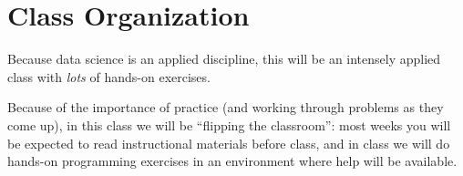 \documentclass[12pt]{article}
\begin{document}
\section{Class Organization}

Because data science is an applied discipline, this will be an intensely applied class with \emph{lots} of hands-on exercises.

Because of the importance of practice (and working through problems as they come up), in this class we will be ``flipping the classroom'': most weeks you will be expected to read instructional materials before class, and in class we will do hands-on programming exercises in an environment where help will be available.


\end{document}
